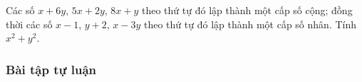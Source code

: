 \begin{vd}%
	Các số $x+6y$, $5x+2y$, $8x+y$ theo thứ tự đó lập thành một cấp số cộng; đồng thời các số $x-1$, $y+2$, $x-3y$ theo thứ tự đó lập thành một cấp số nhân. Tính $x^2+y^2$.
\end{vd}
\subsubsection{Bài tập tự luận}
 
